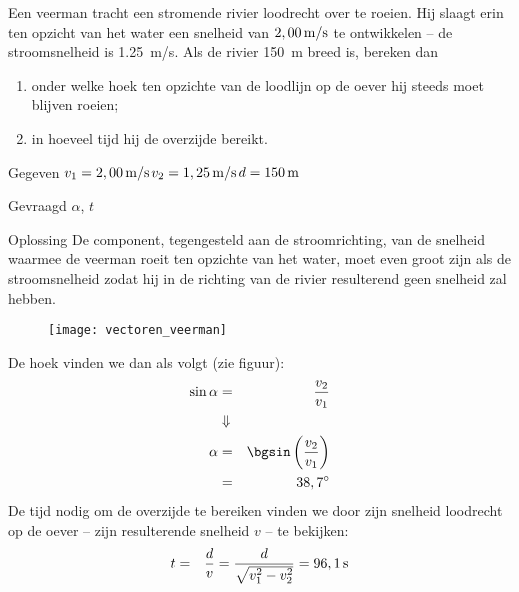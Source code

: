 
\begin{exercise}




 Een veerman tracht een stromende rivier loodrecht over te roeien. Hij slaagt erin ten opzicht van het water een snelheid van $2,00\rm\,m/s$ te ontwikkelen -- de stroomsnelheid is \SI{1,25}{m/s}. Als de rivier \SI{150}{m} breed is, bereken dan
\begin{enumerate}
\item onder welke hoek ten opzichte van de loodlijn op de oever hij steeds moet blijven roeien;
\item in hoeveel tijd hij de overzijde bereikt.
\end{enumerate}
\begin{oplossing}
\item[Gegeven]$v_1=2,00\rm\,m/s$\newline$v_2=1,25\rm\,m/s$\newline$d=150\rm\,m$
\item[Gevraagd]$\alpha$, $t$
\item[Oplossing]De component, tegengesteld aan de stroomrichting, van de snelheid waarmee de veerman roeit ten opzichte van het water, moet even groot zijn als de stroomsnelheid zodat hij in de richting van de rivier resulterend
geen snelheid zal hebben. 
\begin{figure}[h]
\centering
\texttt{[image: vectoren\_veerman]}
\end{figure}
\newline
De hoek vinden we dan als volgt (zie figuur):
\begin{eqnarray*}
\sin{\alpha}&=&\frac{v_2}{v_1}\\
&\Downarrow&\\
\alpha&=&\bgsin\left(\frac{v_2}{v_1}\right)\\
&=&38,7^\circ
\end{eqnarray*}
De tijd nodig om de overzijde te bereiken vinden we door zijn snelheid loodrecht op de oever -- zijn resulterende snelheid $v$ -- te bekijken:
\begin{eqnarray*}
t&=&\frac{d}{v}=\frac{d}{\sqrt{v_1^2-v_2^2}}=96,1{\rm\,s}
\end{eqnarray*}
\end{oplossing}

\end{exercise}

